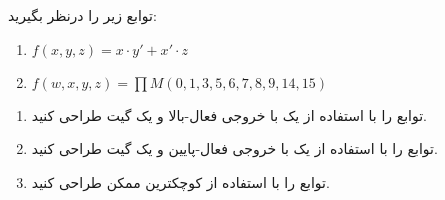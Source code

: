 
توابع زیر را درنظر بگیرید:

\begin{latin}
	\begin{enumerate}
		\item 
		$f(x,y,z)=x\cdot y' + x'\cdot z$
		
		\item 
		$f(w,x,y,z)=\prod M(0,1,3,5,6,7,8,9,14,15)$
	\end{enumerate}
\end{latin}

\begin{enumerate}
	\item 
	توابع را با استفاده از یک  با خروجی فعال-بالا و یک گیت  طراحی کنید.
	
	
	
	\item 
	توابع را با استفاده از یک  با خروجی فعال-پایین و یک گیت  طراحی کنید.
	
	
	
	\item 
	توابع را با استفاده از کوچکترین  ممکن طراحی کنید.

\end{enumerate}